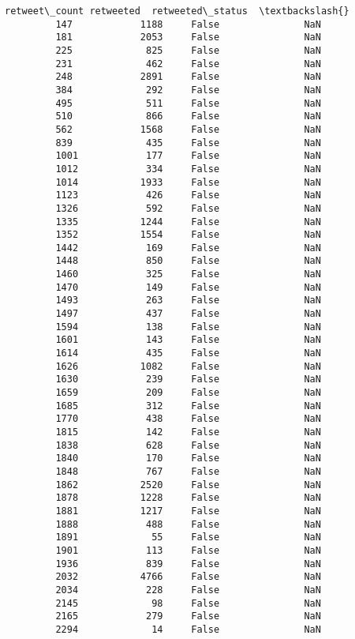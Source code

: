 \documentclass[11pt]{article}
\begin{document}
\begin{Verbatim}[commandchars=\\\{\}]
               retweet\_count retweeted  retweeted\_status  \textbackslash{}
         147            1188     False               NaN   
         181            2053     False               NaN   
         225             825     False               NaN   
         231             462     False               NaN   
         248            2891     False               NaN   
         384             292     False               NaN   
         495             511     False               NaN   
         510             866     False               NaN   
         562            1568     False               NaN   
         839             435     False               NaN   
         1001            177     False               NaN   
         1012            334     False               NaN   
         1014           1933     False               NaN   
         1123            426     False               NaN   
         1326            592     False               NaN   
         1335           1244     False               NaN   
         1352           1554     False               NaN   
         1442            169     False               NaN   
         1448            850     False               NaN   
         1460            325     False               NaN   
         1470            149     False               NaN   
         1493            263     False               NaN   
         1497            437     False               NaN   
         1594            138     False               NaN   
         1601            143     False               NaN   
         1614            435     False               NaN   
         1626           1082     False               NaN   
         1630            239     False               NaN   
         1659            209     False               NaN   
         1685            312     False               NaN   
         1770            438     False               NaN   
         1815            142     False               NaN   
         1838            628     False               NaN   
         1840            170     False               NaN   
         1848            767     False               NaN   
         1862           2520     False               NaN   
         1878           1228     False               NaN   
         1881           1217     False               NaN   
         1888            488     False               NaN   
         1891             55     False               NaN   
         1901            113     False               NaN   
         1936            839     False               NaN   
         2032           4766     False               NaN   
         2034            228     False               NaN   
         2145             98     False               NaN   
         2165            279     False               NaN   
         2294             14     False               NaN   
         

\end{Verbatim}
\end{document}
